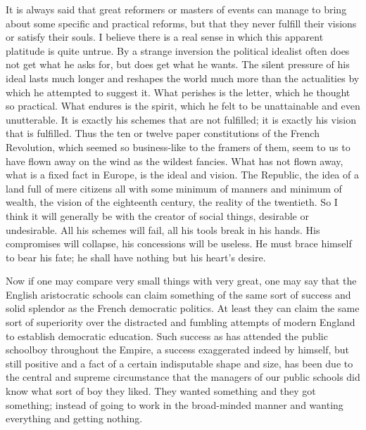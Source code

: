 \documentclass[final,10pt,letterpaper,twocolumn,openany]{book}
\begin{document}
It is always said that great reformers or masters of events can manage
to bring about some specific and practical reforms, but that they never
fulfill their visions or satisfy their souls. I believe there is a real sense in
which this apparent platitude is quite untrue. By a strange inversion the
political idealist often does not get what he asks for, but does get what he
wants. The silent pressure of his ideal lasts much longer and reshapes the
world much more than the actualities by which he attempted to suggest it.
What perishes is the letter, which he thought so practical. What endures is
the spirit, which he felt to be unattainable and even unutterable. It is
exactly his schemes that are not fulfilled; it is exactly his vision that is
fulfilled. Thus the ten or twelve paper constitutions of the French
Revolution, which seemed so business-like to the framers of them, seem to
us to have flown away on the wind as the wildest fancies. What has not
flown away, what is a fixed fact in Europe, is the ideal and vision. The
Republic, the idea of a land full of mere citizens all with some minimum
of manners and minimum of wealth, the vision of the eighteenth century,
the reality of the twentieth. So I think it will generally be with the creator
of social things, desirable or undesirable. All his schemes will fail, all his
tools break in his hands. His compromises will collapse, his concessions
will be useless. He must brace himself to bear his fate; he shall have
nothing but his heart's desire.

Now if one may compare very small things with very great, one may
say that the English aristocratic schools can claim something of the same
sort of success and solid splendor as the French democratic politics. At
least they can claim the same sort of superiority over the distracted and
fumbling attempts of modern England to establish democratic education.
Such success as has attended the public schoolboy throughout the Empire,
a success exaggerated indeed by himself, but still positive and a fact of a
certain indisputable shape and size, has been due to the central and
supreme circumstance that the managers of our public schools did know
what sort of boy they liked. They wanted something and they got
something; instead of going to work in the broad-minded manner and
wanting everything and getting nothing.
\end{document}
